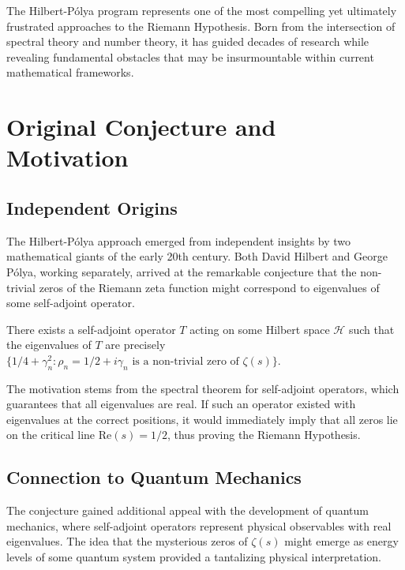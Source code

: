 
The Hilbert-Pólya program represents one of the most compelling yet ultimately frustrated approaches to the Riemann Hypothesis. Born from the intersection of spectral theory and number theory, it has guided decades of research while revealing fundamental obstacles that may be insurmountable within current mathematical frameworks.

\section{Original Conjecture and Motivation}
\label{sec:original_conjecture}

\subsection{Independent Origins}

The Hilbert-Pólya approach emerged from independent insights by two mathematical giants of the early 20th century. Both David Hilbert and George Pólya, working separately, arrived at the remarkable conjecture that the non-trivial zeros of the Riemann zeta function might correspond to eigenvalues of some self-adjoint operator.

\begin{conjecture}
\label{conj:hilbert_polya}
There exists a self-adjoint operator $T$ acting on some Hilbert space $\mathcal{H}$ such that the eigenvalues of $T$ are precisely $\{1/4 + \gamma_n^2 : \rho_n = 1/2 + i\gamma_n \text{ is a non-trivial zero of } \zeta(s)\}$.
\end{conjecture}

The motivation stems from the spectral theorem for self-adjoint operators, which guarantees that all eigenvalues are real. If such an operator existed with eigenvalues at the correct positions, it would immediately imply that all zeros lie on the critical line $\text{Re}(s) = 1/2$, thus proving the Riemann Hypothesis.

\subsection{Connection to Quantum Mechanics}

The conjecture gained additional appeal with the development of quantum mechanics, where self-adjoint operators represent physical observables with real eigenvalues. The idea that the mysterious zeros of $\zeta(s)$ might emerge as energy levels of some quantum system provided a tantalizing physical interpretation.


